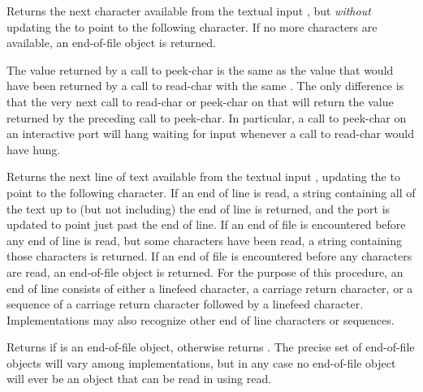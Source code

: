 \begin{entry}{%
}

Returns the next character available from the textual input ,
but {\em without} updating
the  to point to the following character.  If no more characters
are available, an end-of-file object is returned.  

\begin{note}
The value returned by a call to {\cf peek-char} is the same as the
value that would have been returned by a call to {\cf read-char} with the
same .  The only difference is that the very next call to
{\cf read-char} or {\cf peek-char} on that  will return the
value returned by the preceding call to {\cf peek-char}.  In particular, a call
to {\cf peek-char} on an interactive port will hang waiting for input
whenever a call to {\cf read-char} would have hung.
\end{note}

\end{entry}

\begin{entry}{%
}

Returns the next line of text available from the textual input
, updating the  to point to the following character.
If an end of line is read, a string containing all of the text up to
(but not including) the end of line is returned, and the port is updated
to point just past the end of line. If an end of file is encountered
before any end of line is read, but some characters have been
read, a string containing those characters is returned. If an end of
file is encountered before any characters are read, an end-of-file
object is returned.  For the purpose of this procedure, an end of line
consists of either a linefeed character, a carriage return character, or a
sequence of a carriage return character followed by a linefeed character.
Implementations may also recognize other end of line characters or sequences.

\end{entry}


\begin{entry}{%
}

Returns \schtrue{} if  is an end-of-file object, otherwise returns
\schfalse.  The precise set of end-of-file objects will vary among
implementations, but in any case no end-of-file object will ever be an object
that can be read in using {\cf read}.

\end{entry}

